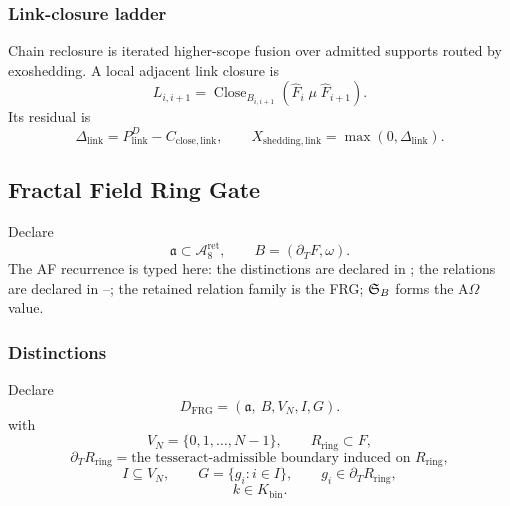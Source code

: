 \subsubsection{Link-closure ladder}\label{subsec:link-closure-ladder}
Chain reclosure is iterated higher-scope fusion over admitted supports routed by exoshedding. A local adjacent link closure is
\begin{equation}
L_{i,i+1}
=
\operatorname{Close}_{B_{i,i+1}}
\left(
\widehat F_i\;\mu\;\widehat F_{i+1}
\right).
\label{eq:link-closure-ladder}
\end{equation}
Its residual is
\begin{equation}
\Delta_{\mathrm{link}}=P^D_{\mathrm{link}}-C_{\mathrm{close,link}},
\qquad
X_{\mathrm{shedding},\mathrm{link}}=\max(0,\Delta_{\mathrm{link}}).
\label{eq:link-closure-residual}
\end{equation}



\subsection{Fractal Field Ring Gate}\label{subsec:fractal-field-ring-gate}

Declare
\begin{equation}
\mathfrak a\subset \mathcal A^{\mathrm{ret}}_8,
\qquad
B=(\partial_TF,\omega).
\label{eq:frg-scope}
\end{equation}
The AF recurrence is typed here: the distinctions are declared in ; the relations are declared in --; the retained relation family is the FRG; \(\mathfrak S_B\) forms the A\(\Omega\) value.

\subsubsection{Distinctions}\label{subsec:frg-distinctions}
Declare
\begin{equation}
D_{\mathrm{FRG}}
=
(\mathfrak a,\ B,V_N,I,G).
\label{eq:frg-distinctions}
\end{equation}
with
\[
V_N=\{0,1,\ldots,N-1\},
\qquad
R_{\mathrm{ring}}\subset F,
\]
\[
\partial_T R_{\mathrm{ring}}
=
\text{the tesseract-admissible boundary induced on }R_{\mathrm{ring}},
\]
\[
I\subseteq V_N,
\qquad
G=\{g_i:i\in I\},
\qquad
g_i\in\partial_T R_{\mathrm{ring}},
\]
\[
k\in K_{\mathrm{bin}}.
\]

